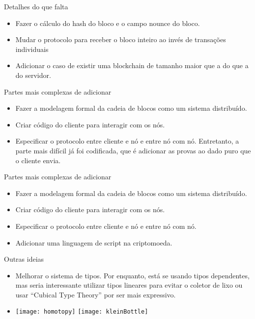 \documentclass{beamer}
\begin{document}
\begin{frame}{Detalhes do que falta}
  \begin{itemize}
    \item Fazer o cálculo do hash do bloco e o campo nounce do bloco.
    \item Mudar o protocolo para receber o bloco inteiro ao invés de transações individuais
    \item Adicionar o caso de existir uma blockchain de tamanho maior que a do que a do servidor.
  \end{itemize}
\end{frame}

\begin{frame}{Partes mais complexas de adicionar}
  \begin{itemize}
    \item Fazer a modelagem formal da cadeia de blocos como um sistema distribuído.
    \item Criar código do cliente para interagir com os nós.
    \item Especificar o protocolo entre cliente e nó e entre nó com nó.
      Entretanto, a parte mais difícil já foi codificada, que é adicionar as provas
      ao dado puro que o cliente envia.
  \end{itemize}
\end{frame}

\begin{frame}{Partes mais complexas de adicionar}
  \begin{itemize}
    \item Fazer a modelagem formal da cadeia de blocos como um sistema distribuído.
    \item Criar código do cliente para interagir com os nós.
    \item Especificar o protocolo entre cliente e nó e entre nó com nó.
    \item Adicionar uma linguagem de script na criptomoeda.
  \end{itemize}
\end{frame}

\begin{frame}{Outras ideias}
  \begin{itemize}
    \item Melhorar o sistema de tipos.
    Por enquanto, está se usando tipos dependentes, mas seria interessante utilizar tipos lineares
    para evitar o coletor de lixo ou usar \foreignquote{english}{Cubical Type Theory} por ser mais expressivo.
  \item
    \texttt{[image: homotopy]}
    \texttt{[image: kleinBottle]}
  \end{itemize}
\end{frame}
\end{document}
